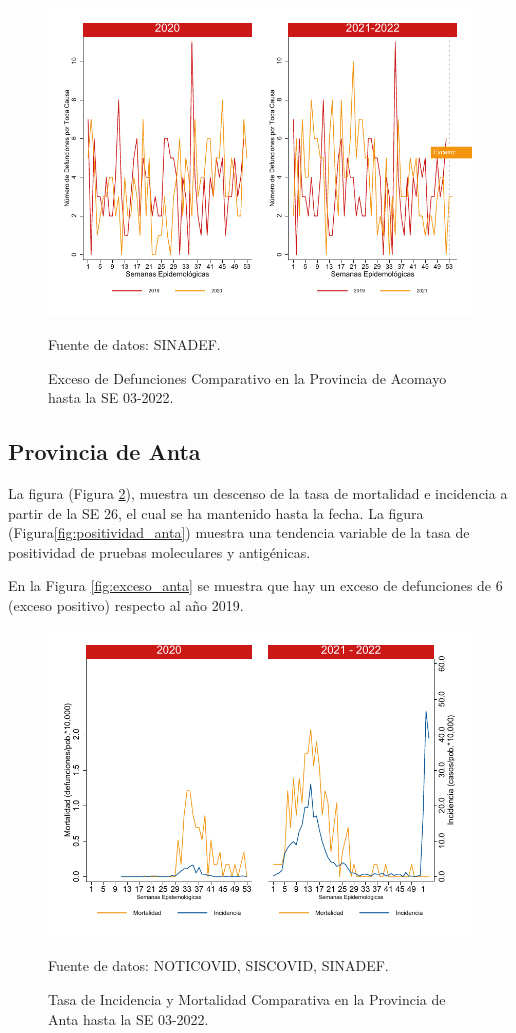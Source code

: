 \documentclass[12pt,a4paper,openany]{book}
\begin{document}
		\begin{figure}[h]
			\caption{Exceso de Defunciones Comparativo en la Provincia de Acomayo hasta la SE 03-2022.}\label{fig:exceso_acomayo}
			\begin{center}
				\includegraphics[width=0.7\linewidth]{../figuras/exceso_1}
			\end{center}
			{\footnotesize {Fuente de datos: SINADEF.}}
		\end{figure}
		
		\clearpage
		
		\subsection*{Provincia de Anta}
		\noindent La figura (Figura \ref{fig:inc_mort_anta}),  muestra un descenso de la tasa de mortalidad e incidencia a partir de la SE 26, el cual se ha mantenido hasta la fecha. 
		\noindent La figura (Figura\ref{fig:positividad_anta}) muestra una tendencia variable de la tasa de positividad de pruebas moleculares y antigénicas.
		
		En la Figura \ref{fig:exceso_anta} se muestra que hay un exceso de defunciones de 6 (exceso positivo) respecto al año 2019.
		
		\begin{figure}[h]
			\caption{Tasa de Incidencia y Mortalidad Comparativa en la Provincia de Anta hasta la SE 03-2022.}\label{fig:inc_mort_anta}
			\begin{center}
				\includegraphics[width=0.7\linewidth]{../figuras/incidencia_mortalidad_20_21_2}
			\end{center}
			{\footnotesize {Fuente de datos: NOTICOVID, SISCOVID, SINADEF.}}
		\end{figure}
		
\end{document}
